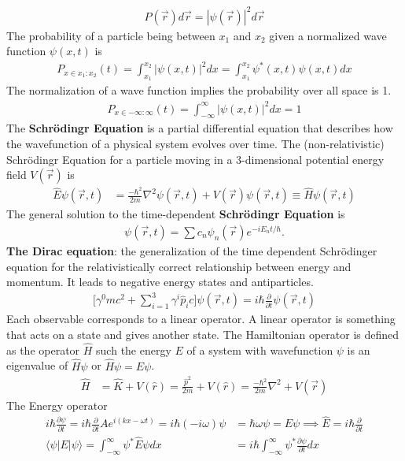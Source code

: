 \begin{align}
	P(\vec{r}) d\vec{r} = |\psi(\vec{r})|^2d\vec{r}
\end{align}
The probability of a particle being between $x_1$ and $x_2$ given a normalized wave function $\psi(x,t)$ is
\begin{align}
	P_{x\in x_1:x_2}(t)=\int_{x_1}^{x_2}|\psi(x,t)|^2dx=\int_{x_1}^{x_2} \psi^*(x,t)\psi(x,t) dx
\end{align}
The normalization of a wave function implies the probability over all space is 1.
\begin{align}
	P_{x\in -\infty:\infty}(t) = \int_{-\infty}^{\infty}|\psi(x,t)|^2dx=1
\end{align}
The \textbf{Schr\"{o}dingr Equation} is a partial differential equation that describes how the wavefunction of a physical system evolves over time. The (non-relativistic) Schr\"{o}dingr Equation for a particle moving in a 3-dimensional potential energy field $V(\vec{r})$ is
\begin{align}
	\hat{E}\psi(\vec{r},t) &= \frac{-\hbar^2}{2m} \nabla^2 \psi(\vec{r},t)+V(\vec{r})\psi(\vec{r},t)  \equiv \hat{H}\psi(\vec{r},t)
\end{align}
The general solution to the time-dependent \textbf{Schr\"{o}dingr Equation} is
\begin{align}
	\psi(\vec{r},t) = \sum c_n \psi_n(\vec{r})e^{-iE_n t/\hbar}.
\end{align}
\textbf{The Dirac equation}: the generalization of the time dependent Schr\"{o}dinger equation for the relativistically correct relationship between energy and momentum. It leads to negative energy states and antiparticles.
\begin{align}
	\bigg[\gamma^0mc^2+\sum_{i=1}^{3}\gamma^i\hat{p}_ic \bigg]\psi(\vec{r},t)=i\hbar\frac{\partial}{\partial t}\psi(\vec{r},t)
\end{align}
Each observable corresponds to a linear operator. A linear operator is something that acts on a state and gives another state.
The Hamiltonian operator is defined as the operator $\hat{H}$ such the energy $E$ of a system with wavefunction $\psi$ is an eigenvalue of $\hat{H}\psi$ or $\hat{H}\psi = E \psi$. 
\begin{align}
	\hat{H} &= \hat{K}+V(\hat{r}) = \frac{\hat{p}^2}{2m}+V(\hat{r})= \frac{-\hbar^2}{2m}\nabla^2	+V(\vec{r})
\end{align}
The Energy operator
\begin{align}
	i\hbar\frac{\partial \psi}{\partial t}=i\hbar\frac{\partial}{\partial t}Ae^{i(kx-\omega t)}=i\hbar(-i\omega)\psi&=\hbar\omega\psi=E\psi \implies\hat{E} = i\hbar \frac{\partial}{\partial t} \\
	\langle\psi| E |\psi \rangle = \int_{-\infty}^{\infty} \psi^* \hat{E} \psi dx &= i\hbar \int_{-\infty}^{\infty} \psi^* \frac{\partial \psi}{\partial t} dx
\end{align}
